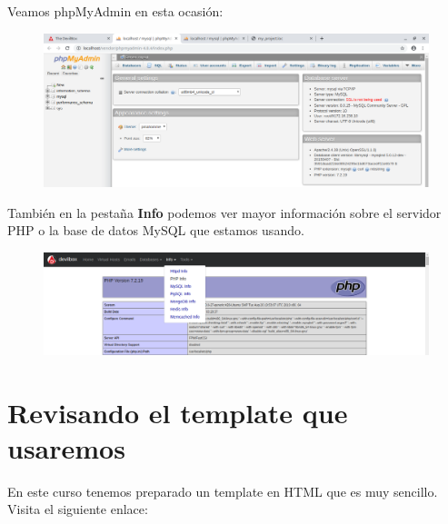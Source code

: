 \documentclass{article}
\begin{document}
Veamos phpMyAdmin en esta ocasión:

\begin{figure}[h!]
  \centering
  \includegraphics[scale=0.5]{./Pictures/Devilbox/031_phpMyAdmin.png}
\end{figure}

También en la pestaña \textbf{Info} podemos ver mayor información sobre el
servidor PHP o la base de datos MySQL que estamos usando.

\begin{figure}[h!]
  \centering
  \includegraphics[scale=0.5]{./Pictures/Devilbox/032_php_info.png}
\end{figure}


\section{Revisando el template que usaremos}%
En este curso tenemos preparado un template en HTML que es muy sencillo. Visita
el siguiente enlace:\\
\end{document}
